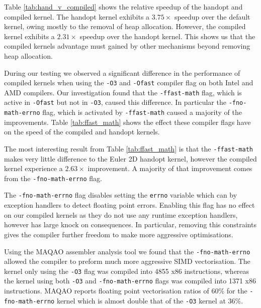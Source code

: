 Table \ref{tab:hand_v_compiled} shows the relative speedup of the handopt and compiled kernel.
The handopt kernel exhibits a $3.75\times$ speedup over the default kernel, owing mostly to the removal of heap allocation.
However, the compiled kernel exhibits a $2.31\times$ speedup over the handopt kernel.
This shows us that the compiled kernels advantage must gained by other mechanisms beyond removing heap allocation.

During our testing we observed a significant difference in the performance of compiled kernels when using the \texttt{-O3} and \texttt{-Ofast} compiler flag on both Intel and AMD compilers.
Our investigation found that the \texttt{-ffast-math} flag, which is active in \texttt{-Ofast} but not in \texttt{-O3}, caused this difference.
In particular the \texttt{-fno-math-errno} flag, which is activated by \texttt{-ffast-math} caused a majority of the improvements.
Table \ref{tab:ffast_math} shows the effect these compiler flags have on the speed of the compiled and handopt kernels.

\begin{table}
    \centering
 
\caption{}\label{tab:ffast_math} 
\end{table}

The most interesting result from Table \ref{tab:ffast_math} is that the \texttt{-ffast-math} makes very little difference to the Euler 2D handopt kernel, however the compiled kernel experience a $2.63\times$ improvement.
A majority of that improvement comes from the \texttt{-fno-math-errno} flag.

The \texttt{-fno-math-errno} flag disables setting the \texttt{errno} variable which can by exception handlers to detect floating point errors.
Enabling this flag has no effect on our compiled kernels as they do not use any runtime exception handlers, however has large knock on consequences.
In particular, removing this constraints gives the compiler further freedom to make more aggressive optimisations.

Using the MAQAO assembler analysis tool \cite{MAQAO} we found that the \texttt{-fno-math-errno} allowed the compiler to preform much more aggressive SIMD vectorisation.
The kernel only using the \texttt{-O3} flag was compiled into 4855 x86 instructions, whereas the kernel using both \texttt{-O3} and \texttt{-fno-math-errno} flags was compiled into 1371 x86 instructions.
MAQAO reports floating point vectorisation ratios of 60\% for the \texttt{-fno-math-errno} kernel which is almost double that of the \texttt{-O3} kernel at 36\%.


